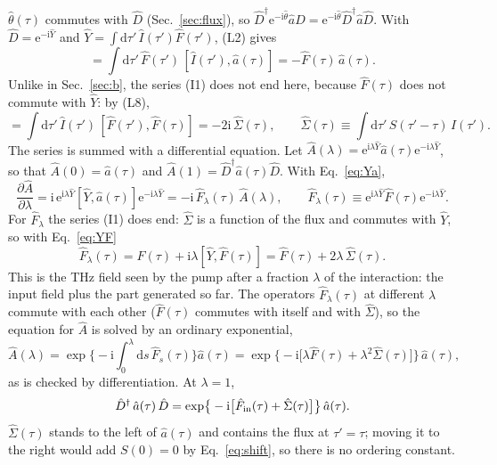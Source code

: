 \documentclass[aps,pra,onecolumn,notitlepage,11pt,amsmath,amssymb,nofootinbib]{revtex4-2}
\newcommand{\Iop}{\hat I}
\newcommand{\dd}{\mathrm{d}}
\newcommand{\ee}{\mathrm{e}}
\newcommand{\ii}{\mathrm{i}}
\begin{document}
$\hat\theta(\tau)$ commutes with $\hat D$ (Sec.~\ref{sec:flux}), so
$\hat D^\dagger\ee^{-\ii\hat\theta}\hat a\hat D
=\ee^{-\ii\hat\theta}\hat D^\dagger\hat a\hat D$. With
$\hat D=\ee^{-\ii\hat Y}$ and $\hat Y=\int\dd\tau'\,\Iop(\tau')\hat F(\tau')$,
(L2) gives
\begin{equation}
[\hat Y,\hat a(\tau)]=\int\!\dd\tau'\,\hat F(\tau')\,[\Iop(\tau'),\hat a(\tau)]
=-\hat F(\tau)\,\hat a(\tau).
\label{eq:Ya}
\end{equation}
Unlike in Sec.~\ref{sec:b}, the series (I1) does not end here, because
$\hat F(\tau)$ does not commute with $\hat Y$: by (L8),
\begin{equation}
[\hat Y,\hat F(\tau)]=\int\!\dd\tau'\,\Iop(\tau')\,[\hat F(\tau'),\hat F(\tau)]
=-2\ii\,\hat\Sigma(\tau),\qquad
\hat\Sigma(\tau)\equiv\int\!\dd\tau'\,S(\tau'-\tau)\,\Iop(\tau').
\label{eq:YF}
\end{equation}
The series is summed with a differential equation. Let
$\hat A(\lambda)=\ee^{\ii\lambda\hat Y}\hat a(\tau)\ee^{-\ii\lambda\hat Y}$, so
that $\hat A(0)=\hat a(\tau)$ and $\hat A(1)=\hat D^\dagger\hat a(\tau)\hat D$.
With Eq.~\eqref{eq:Ya},
\begin{equation}
\frac{\partial\hat A}{\partial\lambda}
=\ii\,\ee^{\ii\lambda\hat Y}[\hat Y,\hat a(\tau)]\ee^{-\ii\lambda\hat Y}
=-\ii\,\hat F_\lambda(\tau)\,\hat A(\lambda),\qquad
\hat F_\lambda(\tau)\equiv\ee^{\ii\lambda\hat Y}\hat F(\tau)\ee^{-\ii\lambda\hat Y}.
\end{equation}
For $\hat F_\lambda$ the series (I1) does end: $\hat\Sigma$ is a function of
the flux and commutes with $\hat Y$, so with Eq.~\eqref{eq:YF}
\begin{equation}
\hat F_\lambda(\tau)=\hat F(\tau)+\ii\lambda[\hat Y,\hat F(\tau)]
=\hat F(\tau)+2\lambda\,\hat\Sigma(\tau).
\label{eq:Flam}
\end{equation}
This is the THz field seen by the pump after a fraction $\lambda$ of the
interaction: the input field plus the part generated so far. The operators
$\hat F_\lambda(\tau)$ at different $\lambda$ commute with each other
($\hat F(\tau)$ commutes with itself and with $\hat\Sigma$), so the equation
for $\hat A$ is solved by an ordinary exponential,
\begin{equation}
\hat A(\lambda)=\exp\!\Big\{-\ii\int_0^\lambda\!\!\dd s\,\hat F_s(\tau)\Big\}\hat a(\tau)
=\exp\!\big\{-\ii\big[\lambda\hat F(\tau)+\lambda^2\hat\Sigma(\tau)\big]\big\}\,\hat a(\tau),
\end{equation}
as is checked by differentiation. At $\lambda=1$,
\begin{equation}
\hat D^\dagger\,\hat a(\tau)\,\hat D
=\exp\!\big\{-\ii\big[\hat F_{\rm in}(\tau)+\hat\Sigma(\tau)\big]\big\}\,\hat a(\tau).
\label{eq:step2}
\end{equation}
$\hat\Sigma(\tau)$ stands to the left of $\hat a(\tau)$ and contains the flux
at $\tau'=\tau$; moving it to the right would add $S(0)=0$ by
Eq.~\eqref{eq:shift}, so there is no ordering constant.
\end{document}

